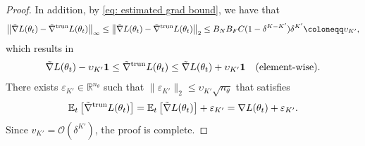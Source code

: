 \documentclass{article}
\def\R{\mathbb{R}}
\def\E{\mathbb{E}}
\def\tgrad{\Tilde{\nabla}}
\newcommand{\bigO}{\mathcal{O}}
\begin{document}
\begin{proof}
    In addition, by \eqref{eq: estimated grad bound}, we have that 
    \begin{align*}
       \left\| \tgrad L(\theta_t) - \tgrad^\mathrm{trun} L(\theta_t) \right\|_\infty \leq  \left\| \tgrad L(\theta_t) - \tgrad^\mathrm{trun} L(\theta_t) \right\|_2 \leq B_N B_F C (1 - \delta^{K-K'})\delta^{K'} \coloneqq \upsilon_{K'},
    \end{align*}
    which results in 
    \begin{align*}
        \tgrad L(\theta_t) - \upsilon_{K'} \mathbf{1} \leq \tgrad^\mathrm{trun} L(\theta_t) \leq \tgrad L(\theta_t) + \upsilon_{K'} \mathbf{1} \quad \text{(element-wise)}.
    \end{align*}
    There exists $\varepsilon_{K'} \in \R^{n_\theta}$ such that $\|\varepsilon_{K'}\|_2 \leq \upsilon_{K'} \sqrt{n_\theta}$ that satisfies 
    \begin{align*}
        \E_t\left[ \tgrad^\mathrm{trun} L(\theta_t) \right] = \E_t\left[ \tgrad L(\theta_t) \right] + \varepsilon_{K'} = \nabla L(\theta_t) + \varepsilon_{K'}.
    \end{align*}    
    Since $v_{K'} = \bigO(\delta^{K'})$, the proof is complete.
\end{proof}
\end{document}
